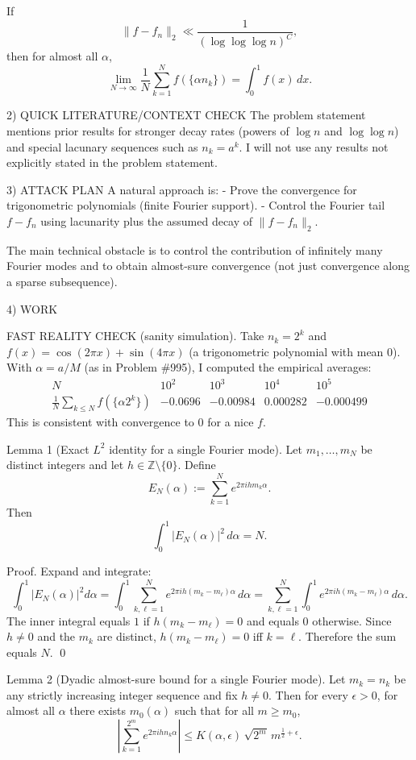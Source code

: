 If
\[
 \|f-f_n\|_2 \ll \frac{1}{(\log\log\log n)^C},
\]
then for almost all $\alpha$,
\[
 \lim_{N\to\infty}\frac{1}{N}\sum_{k=1}^N f(\{\alpha n_k\}) = \int_0^1 f(x)\,dx.
\]

2) QUICK LITERATURE/CONTEXT CHECK
The problem statement mentions prior results for stronger decay rates (powers of $\log n$ and $\log\log n$) and special lacunary sequences such as $n_k=a^k$.  I will not use any results not explicitly stated in the problem statement.

3) ATTACK PLAN
A natural approach is:
- Prove the convergence for trigonometric polynomials (finite Fourier support).
- Control the Fourier tail $f-f_n$ using lacunarity plus the assumed decay of $\|f-f_n\|_2$.

The main technical obstacle is to control the contribution of infinitely many Fourier modes and to obtain almost-sure convergence (not just convergence along a sparse subsequence).

4) WORK

FAST REALITY CHECK (sanity simulation).
Take $n_k=2^k$ and $f(x)=\cos(2\pi x)+\sin(4\pi x)$ (a trigonometric polynomial with mean $0$).  With $\alpha=a/M$ (as in Problem \#995), I computed the empirical averages:
\[
\begin{array}{c|cccc}
 N & 10^2 & 10^3 & 10^4 & 10^5\\\hline
 \frac1N\sum_{k\le N} f(\{\alpha 2^k\}) & -0.0696 & -0.00984 & 0.000282 & -0.000499
\end{array}
\]
This is consistent with convergence to $0$ for a nice $f$.

Lemma 1 (Exact $L^2$ identity for a single Fourier mode).
Let $m_1,\dots,m_N$ be distinct integers and let $h\in\mathbb{Z}\setminus\{0\}$.  Define
\[
E_N(\alpha):=\sum_{k=1}^N e^{2\pi i h m_k \alpha}.
\]
Then
\[
\int_0^1 |E_N(\alpha)|^2\,d\alpha = N.
\]

Proof.
Expand and integrate:
\[
\int_0^1 |E_N(\alpha)|^2 d\alpha
=\int_0^1 \sum_{k,\ell=1}^N e^{2\pi i h(m_k-m_\ell)\alpha}\,d\alpha
=\sum_{k,\ell=1}^N \int_0^1 e^{2\pi i h(m_k-m_\ell)\alpha}\,d\alpha.
\]
The inner integral equals $1$ if $h(m_k-m_\ell)=0$ and equals $0$ otherwise.  Since $h\neq 0$ and the $m_k$ are distinct, $h(m_k-m_\ell)=0$ iff $k=\ell$.  Therefore the sum equals $N$. \qed

Lemma 2 (Dyadic almost-sure bound for a single Fourier mode).
Let $m_k=n_k$ be any strictly increasing integer sequence and fix $h\neq 0$.  Then for every $\epsilon>0$, for almost all $\alpha$ there exists $m_0(\alpha)$ such that for all $m\ge m_0$,
\[
\left|\sum_{k=1}^{2^m} e^{2\pi i h n_k\alpha}\right| \le K(\alpha,\epsilon)\,\sqrt{2^m}\,m^{\frac12+\epsilon}.
\]

